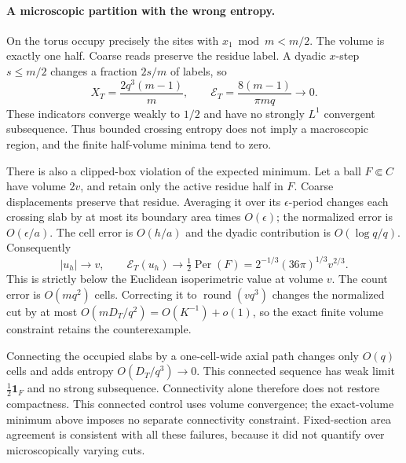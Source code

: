 \paragraph{A microscopic partition with the wrong entropy.}
On the torus occupy precisely the sites with $x_1\bmod m<m/2$. The volume
is exactly one half. Coarse reads preserve the residue label. A dyadic
$x$-step $s\le m/2$ changes a fraction $2s/m$ of labels, so
\[
 X_T=\frac{2q^3(m-1)}m,\qquad
 \mathcal E_T=\frac{8(m-1)}{\pi m q}\longrightarrow0.
\]
These indicators converge weakly to $1/2$ and have no strongly $L^1$
convergent subsequence. Thus bounded crossing entropy does not imply a
macroscopic region, and the finite half-volume minima tend to zero.

There is also a clipped-box violation of the expected minimum. Let a ball
$F\Subset C$ have volume $2v$, and retain only the active residue half in
$F$. Coarse displacements preserve that residue. Averaging it over its
$\epsilon$-period changes each crossing slab by at most its boundary area
times $O(\epsilon)$; the normalized error is $O(\epsilon/a)$.
The cell error is $O(h/a)$ and the dyadic contribution is
$O(\log q/q)$. Consequently
\[
 |u_h|\to v,\qquad
 \mathcal E_T(u_h)\to\tfrac12\operatorname{Per}(F)
 =2^{-1/3}(36\pi)^{1/3}v^{2/3}.
\]
This is strictly below the Euclidean isoperimetric value at volume $v$.
The count error is $O(mq^2)$ cells. Correcting it to $\operatorname{round}(vq^3)$
changes the normalized cut by at most $O(mD_T/q^2)=O(K^{-1})+o(1)$,
so the exact finite volume constraint retains the counterexample.

Connecting the occupied slabs by a one-cell-wide axial path changes only
$O(q)$ cells and adds entropy $O(D_T/q^3)\to0$. This connected sequence
has weak limit $\tfrac12\mathbf1_F$ and no strong subsequence.
Connectivity alone therefore does not restore compactness. This connected
control uses volume convergence; the exact-volume minimum above imposes
no separate connectivity constraint. Fixed-section area agreement is
consistent with all these failures, because it did not quantify over
microscopically varying cuts.

